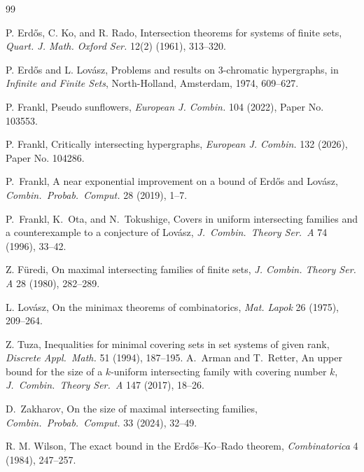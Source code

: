 \documentclass[11pt]{article}
\numberwithin{equation}{section}
\begin{document}
	\begin{thebibliography}{99}

			P. Erd\H{o}s, C. Ko, and R. Rado,
			Intersection theorems for systems of finite sets,
			\emph{Quart. J. Math. Oxford Ser. } 12(2) (1961), 313--320.
			
			P. Erd\H{o}s and L. Lov\'asz,
			Problems and results on 3-chromatic hypergraphs,
			in \emph{Infinite and Finite Sets}, North-Holland, Amsterdam, 1974, 609--627.
		
			
			
			
			P. Frankl,
			 Pseudo sunflowers,
			 \emph{European J. Combin.} 104 (2022), Paper No. 103553.
			
			P. Frankl,
			 Critically intersecting hypergraphs,
			 \emph{European J. Combin.} 132 (2026), Paper No. 104286.


	P.~Frankl, A near exponential improvement on a bound of Erd\H{o}s and Lov\'{a}sz, {\em Combin.\ Probab.\ Comput.} 28 (2019), 1--7.

	
P.~Frankl, K.~Ota, and N.~Tokushige, Covers in uniform intersecting families and a counterexample to a conjecture of Lov\'{a}sz, {\em J.\ Combin.\ Theory Ser.\ A} 74 (1996), 33--42.

	
Z. F\"uredi,
	On maximal intersecting families of finite sets,
\emph{J. Combin. Theory Ser. A} 28 (1980), 282--289.

 L. Lov\'asz, On the minimax theorems of combinatorics, {\em Mat. Lapok} 26 (1975), 209--264.
			
			

Z. Tuza, Inequalities for minimal covering sets in set systems of given rank, {\em Discrete Appl.\ Math.} 51 (1994), 187--195.
					 A.~Arman and T.~Retter, An upper bound for the size of a $k$-uniform intersecting family with covering number $k$, {\em J.\ Combin.\ Theory Ser.\ A} 147 (2017), 18--26.



			D.~Zakharov, On the size of maximal intersecting families, {\em Combin.\ Probab.\ Comput.} 33 (2024), 32--49.

			R. M. Wilson,
			The exact bound in the Erd\H{o}s--Ko--Rado theorem,
			\emph{Combinatorica} 4 (1984), 247--257.

	\end{thebibliography}
\end{document}
